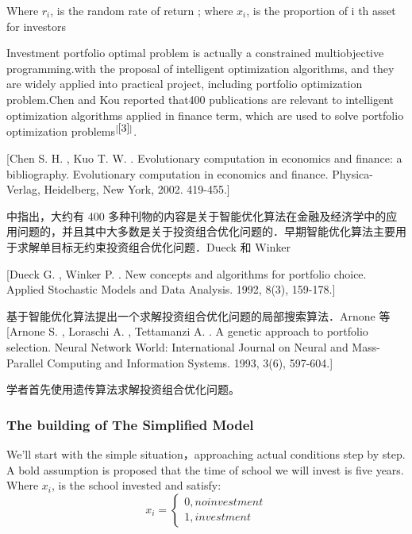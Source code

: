 Where $r_i$, is the random rate of return ;
where $x_i$, is the proportion of i th asset for investors

Investment portfolio optimal problem is actually a constrained multiobjective programming.with the proposal of intelligent optimization algorithms, and they are widely applied into practical project, including portfolio optimization problem.Chen and Kou reported that400 publications are relevant to intelligent optimization algorithms applied in finance term, which are used to solve portfolio optimization problems$^{[\ref{3}]}$.

[Chen S. H. , Kuo T. W. . Evolutionary computation in economics and finance: a bibliography.  Evolutionary  computation  in  economics  and  finance. Physica-Verlag, Heidelberg, New York, 2002. 419-455.]

中指出，大约有 400 多种刊物的内容是关于智能优化算法在金融及经济学中的应用问题的，并且其中大多数是关于投资组合优化问题的．早期智能优化算法主要用于求解单目标无约束投资组合优化问题．Dueck 和 Winker

[Dueck  G.  ,  Winker  P.  .  New  concepts  and  algorithms  for  portfolio  choice. Applied Stochastic Models and Data Analysis. 1992, 8(3), 159-178.]

基于智能优化算法提出一个求解投资组合优化问题的局部搜索算法．Arnone 等
[Arnone  S.  ,  Loraschi  A.  ,  Tettamanzi  A.  .  A  genetic  approach  to  portfolio selection.  Neural  Network  World:  International  Journal  on  Neural  and Mass-Parallel Computing and Information Systems. 1993, 3(6), 597-604.]

学者首先使用遗传算法求解投资组合优化问题。
\par

\subsubsection{The building of The Simplified Model}
We'll start with the simple situation，approaching actual conditions step by step. A bold assumption is proposed that the time of school we will invest is five years. Where $x_i$, is the school invested and satisfy:
$$x_i=
\begin{cases}
0,no investment\\
1,investment
\end{cases}$$

